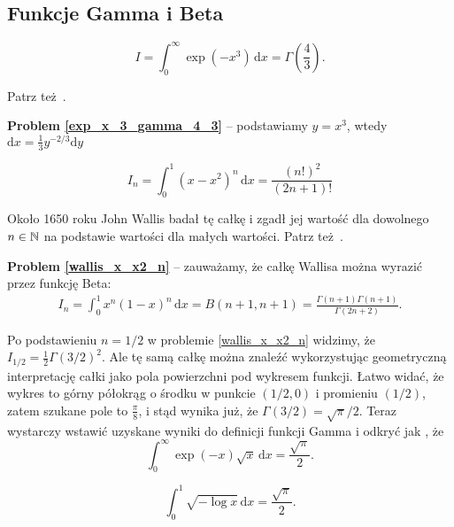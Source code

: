 \subsection{Funkcje Gamma i Beta}
\begin{problem}
\label{exp_x_3_gamma_4_3}%
    \begin{equation}
        I = \int_{0}^\infty \exp \left( -x^3 \right) \,\mathrm{d} x = \Gamma \left( \frac 4 3 \right).
    \end{equation}
\end{problem}

Patrz też \cite[s. 119]{nahin15}.

\textbf{Problem \ref{exp_x_3_gamma_4_3}} -- podstawiamy $y = x^3$, wtedy $\mathrm{d}x = \frac 1 3 y^{-2/3} \mathrm{d}y$

\begin{problem}
\label{wallis_x_x2_n}%
    \begin{equation}
        I_n = \int_{0}^1 (x-x^2)^n \,\mathrm{d} x = \frac{(n!)^2}{(2n+1)!}
    \end{equation}
\end{problem}

Około 1650 roku John Wallis badał tę całkę i zgadł jej wartość dla dowolnego $n \in {\mathbb N}$ na podstawie wartości dla małych wartości.
Patrz też \cite[s. 119-122]{nahin15}.

\textbf{Problem \ref{wallis_x_x2_n}} -- zauważamy, że całkę Wallisa można wyrazić przez funkcję Beta:
\begin{align}
	I_n = \int_{0}^1 x^n (1-x)^n \,\mathrm{d} x = B(n+1, n+1) = \frac{\Gamma(n+1) \Gamma(n+1)}{\Gamma(2n+2)}.
\end{align}

Po podstawieniu $n = 1/2$ w problemie \ref{wallis_x_x2_n} widzimy, że $I_{1/2} = \frac 1 2 \Gamma(3/2)^2$.
Ale tę samą całkę można znaleźć wykorzystując geometryczną interpretację całki jako pola powierzchni pod wykresem funkcji.
Łatwo widać, że wykres to górny półokrąg o środku w punkcie $(1/2, 0)$ i promieniu $(1/2)$, zatem szukane pole to $\frac \pi 8$, i stąd wynika już, że $\Gamma(3/2) = \sqrt{\pi}/2$.
Teraz wystarczy wstawić uzyskane wyniki do definicji funkcji Gamma i odkryć jak \cite[s. 123]{nahin15}, że
\begin{equation}
    \int_{0}^\infty \exp(-x) \sqrt{x} \,\mathrm{d} x = \frac{\sqrt \pi}{2}.
\end{equation}

\begin{problem_with_solution}
\label{sqrt_minus_log}%
    \begin{equation}
        \int_{0}^1 \sqrt{- \log x} \,\mathrm{d} x = \frac{\sqrt \pi}{2}.
    \end{equation}
\end{problem_with_solution}

